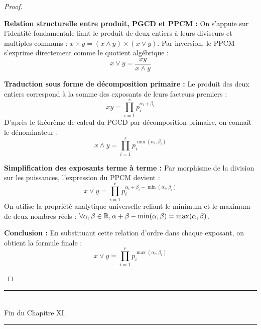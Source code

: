 \documentclass[12pt, a4paper]{report}
\begin{document}
\begin{proof}
    \begin{outline}
        \1 \textbf{Relation structurelle entre produit, PGCD et PPCM :}
            \2 On s'appuie sur l'identité fondamentale liant le produit de deux entiers à leurs diviseurs et multiples communs : $x \times y = (x \wedge y) \times (x \vee y)$.
            \2 Par inversion, le PPCM s'exprime directement comme le quotient algébrique :
               \[ x \vee y = \frac{x y}{x \wedge y} \]

        \1 \textbf{Traduction sous forme de décomposition primaire :}
            \2 Le produit des deux entiers correspond à la somme des exposants de leurs facteurs premiers :
               \[ x y = \prod_{i=1}^r p_i^{\alpha_i + \beta_i} \]
            \2 D'après le théorème de calcul du PGCD par décomposition primaire, on connaît le dénominateur :
               \[ x \wedge y = \prod_{i=1}^r p_i^{\min(\alpha_i,\beta_i)} \]

        \1 \textbf{Simplification des exposants terme à terme :}
            \2 Par morphisme de la division sur les puissances, l'expression du PPCM devient :
               \[ x \vee y = \prod_{i=1}^r p_i^{\alpha_i + \beta_i - \min(\alpha_i,\beta_i)} \]
            \2 On utilise la propriété analytique universelle reliant le minimum et le maximum de deux nombres réels : $\forall \alpha, \beta \in \mathbb{R}, \alpha + \beta - \min(\alpha,\beta) = \max(\alpha,\beta)$.

        \1 \textbf{Conclusion :} 
            \2 En substituant cette relation d'ordre dans chaque exposant, on obtient la formule finale :
               \[ x \vee y = \prod_{i=1}^r p_i^{\max(\alpha_i,\beta_i)} \]
    \end{outline}
\end{proof}

\begin{center}
    \rule{0.5\textwidth}{1pt}\\
    Fin du Chapitre XI.\\
    \rule{0.5\textwidth}{1pt}
\end{center}
\end{document}
